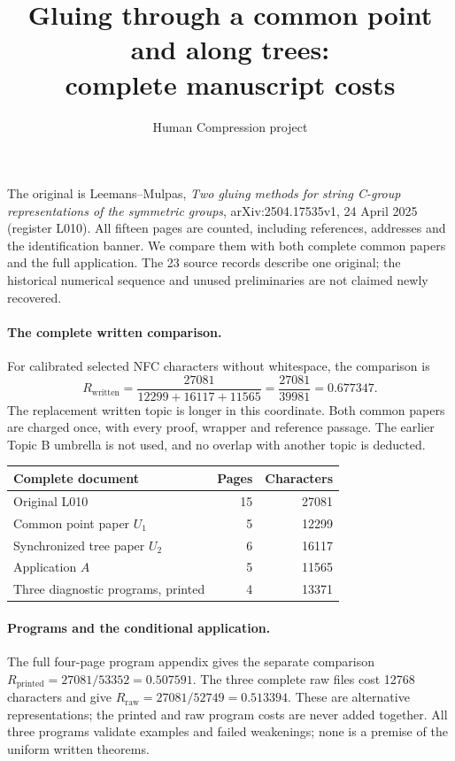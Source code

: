 \documentclass[11pt,a4paper]{article}
\title{Gluing through a common point and along trees:\\complete manuscript costs}
\author{Human Compression project}\date{}
\begin{document}
\maketitle
The original is Leemans--Mulpas, \emph{Two gluing methods for string C-group
representations of the symmetric groups}, arXiv:2504.17535v1, 24 April 2025
(register L010). All fifteen pages are counted, including references,
addresses and the identification banner. We compare them with both complete
common papers and the full application. The 23 source records describe one
original; the historical numerical sequence and unused preliminaries are
not claimed newly recovered.

\paragraph{The complete written comparison.}
For calibrated selected NFC characters without whitespace, the comparison is
\[
R_{\mathrm{written}}=\frac{27081}{12299+16117+11565}
=\frac{27081}{39981}=0.677347.
\]
The replacement written topic is longer in this coordinate. Both common
papers are charged once, with every proof, wrapper and reference passage.
The earlier Topic B umbrella is not used, and no overlap with another topic
is deducted.

\begin{center}\begin{tabular}{lrr}\toprule
Complete document&Pages&Characters\\\midrule
Original L010&15&27081\\
Common point paper $U_1$&5&12299\\
Synchronized tree paper $U_2$&6&16117\\
Application $A$&5&11565\\
Three diagnostic programs, printed&4&13371\\\bottomrule
\end{tabular}\end{center}

\paragraph{Programs and the conditional application.}
The full four-page program appendix gives the separate comparison
$R_{\mathrm{printed}}=27081/53352=0.507591$.
The three complete raw files cost 12768 characters and give
$R_{\mathrm{raw}}=27081/52749=0.513394$. These are alternative representations;
the printed and raw program costs are never added together. All three
programs validate examples and failed weakenings; none is a premise of the
uniform written theorems.
\end{document}
